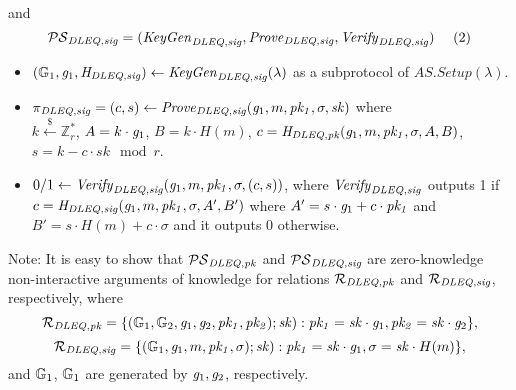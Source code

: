 \begin{construction}
and 
$$ \PSsig = (\Gensig, \Provsig, \Verisig) \ \ \ \ (2)$$ 
\begin{itemize}
\item $(\GoneBLS, \goneBLS, \Hsig) \leftarrow \Gensig(\lambda)$ as a subprotocol of $\mathit{AS.Setup}(\lambda)$. 
\item $\pisig = (c,s) \leftarrow \Provsig(\goneBLS, m, \mathit{pk_1}, \sigma, \mathit{sk})$ where \\ $k \xleftarrow{\$} \mathbb{Z}_{r}^{*}$, $A =k \cdot \goneBLS$, 
$B=k \cdot H(m)$, $c = \Hpk (\goneBLS, m, \mathit{pk_1}, \sigma, A, B)$, \\ $s = k - c \cdot \mathit{sk} \mod r$. 
\item $0/1 \leftarrow \Verisig(\goneBLS, m, \mathit{pk_1}, \sigma, (c,s))$, 
where $\Verisig$ outputs 1 if  $c= \Hsig (\goneBLS, m, \mathit{pk_1}, \sigma, A', B')$
where $A' = s \cdot \goneBLS + c \cdot \mathit{pk_1}$ and $B' = s \cdot H(m)  + c \cdot \sigma$ and it outputs $0$ otherwise.  
\end{itemize}
\end{construction}
\noindent Note: It is easy to show that $\PSpk$ and $\PSsig$ are zero-knowledge non-interactive arguments of knowledge for relations $\Rpk$ and $\Rsig$, respectively, where 
$$\Rpk = \{( \GoneBLS, \GtwoBLS, \goneBLS, \gtwoBLS, \mathit{pk_1}, \mathit{pk_2}); \mathit{sk}) : \mathit{pk_1} = \mathit{sk} \cdot \goneBLS, \mathit{pk_2} = \mathit{sk} \cdot \gtwoBLS \},$$
$$\Rsig = \{( \GoneBLS, \goneBLS, m, \mathit{pk_1}, \sigma); \mathit{sk}) : \mathit{pk_1} = \mathit{sk} \cdot \goneBLS, \sigma = \mathit{sk} \cdot H(m)\},$$
and $\GoneBLS$, $\GoneBLS$ are generated by $\goneBLS, \gtwoBLS$, respectively.


